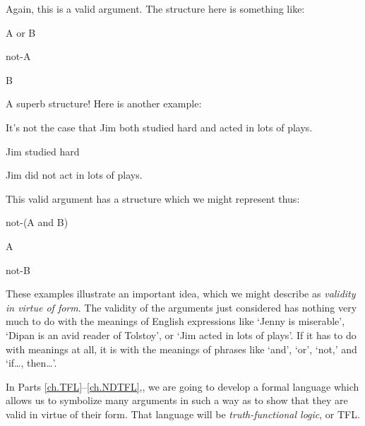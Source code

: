 Again, this is a valid argument. The structure here is something like:
	\begin{earg}
		\item[] A or B
		\item[] not-A
		\item[\therefore] B
	\end{earg}
A superb structure! Here is another example:
	\begin{earg}
		\item[] It's not the case that Jim both studied hard and acted in lots of plays.
		\item[] Jim studied hard
		\item[\therefore] Jim did not act in lots of plays.
	\end{earg}
This valid argument has a structure which we might represent thus:
	\begin{earg}
		\item[] not-(A and B)
		\item[] A
		\item[\therefore] not-B
	\end{earg}
These examples illustrate an important idea, which we might describe as \emph{validity in virtue of form}. The validity of the arguments just considered has nothing very much to do with the meanings of English expressions like `Jenny is miserable', `Dipan is an avid reader of Tolstoy', or `Jim acted in lots of plays'. If it has to do with meanings at all, it is with the meanings of phrases like `and', `or', `not,' and `if\ldots, then\ldots'. 

In Parts \ref{ch.TFL}--\ref{ch.NDTFL},, we are going to develop a formal language which allows us to symbolize many arguments in such a way as to show that they are valid in virtue of their form. That language will be \emph{truth-functional logic}, or TFL.

